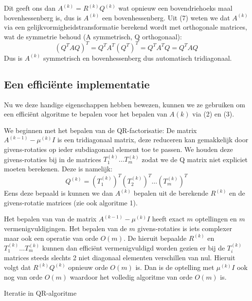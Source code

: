 \documentclass[a4paper]{article}
\begin{document}
	\noindent Dit geeft ons dan $A^{(k)} = R^{(k)}Q^{(k)}$ wat opnieuw een bovendriehoeks maal bovenhessenberg is, dus is $A^{(k)}$ een bovenhessenberg. Uit (7) weten we dat $A^{(k)}$ via een gelijkvormigheidstransformatie berekend wordt met orthogonale matrices, wat de symmetrie behoud (A symmetrisch, Q orthogonaal):
	\[
		(Q^TAQ)^T = Q^TA^T(Q^T)^T = Q^TA^TQ = Q^TAQ
	\]
	Dus is $A^{(k)}$ symmetrisch en bovenhessenberg dus automatisch tridiagonaal.
\subsection{Een efficiënte implementatie}
Nu we deze handige eigenschappen hebben bewezen, kunnen we ze gebruiken om een efficiënt algoritme te bepalen voor het bepalen van $A(k)$ via (2) en (3).

\noindent We beginnen met het bepalen van de QR-factorisatie: De matrix $A^{(k-1)} - \mu ^{(k)}I$ is een tridiagonaal matrix, deze reduceren kan gemakkelijk door givens-rotaties op ieder subdiagonaal element toe te passen. We houden deze givens-rotaties bij in de matrices $T^{(k)}_1\dots T^{(k)}_m$ zodat we de Q matrix niet expliciet moeten berekenen. Deze is namelijk:
\[
	Q^{(k)} = (T^{(k)}_1)^T(T^{(k)}_2)^T \dots (T^{(k)}_m)^T 
\]
Eens deze bepaald is kunnen we dan $A^{(k)}$ bepalen uit de berekende $R^{(k)}$ en de givens-rotatie matrices (zie ook algoritme 1). 

\noindent Het bepalen van van de matrix  $A^{(k-1)} - \mu ^{(k)}I$ heeft exact $m$ optellingen en $m$ vermenigvuldigingen.
Het bepalen van de $m$ givens-rotaties is iets complexer maar ook een operatie van orde $O(m)$. De hieruit bepaalde $R^{(k)}$ en $T^{(k)}_1\dots T^{(k)}_m$ kunnen dan efficiënt vermenigvuldigd worden gezien er bij de $T^{(k)}_i$ matrices steeds slechts 2 niet diagonaal elementen verschillen van nul. Hieruit volgt dat $R^{(k)}Q^{(k)}$ opnieuw orde $O(m)$ is. Dan is de optelling met $\mu ^{(k)}I$ ook nog van orde $O(m)$ waardoor het volledig algoritme van orde $O(m)$ is.

\begin{algorithm}[H]
	\caption{Iteratie in QR-algoritme}
\end{algorithm}
\end{document}
